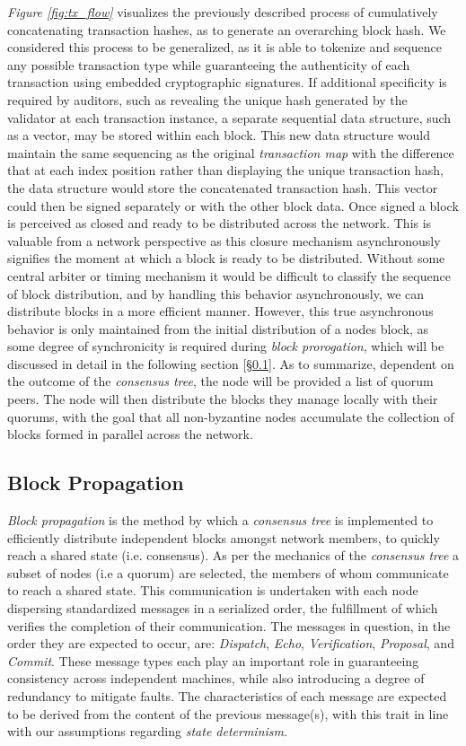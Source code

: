 \textit{Figure \ref{fig:tx_flow}} visualizes the previously described process of cumulatively concatenating transaction hashes, as to generate an overarching block hash. We considered this process to be generalized, as it is able to tokenize and sequence any possible transaction type while guaranteeing the authenticity of each transaction using embedded cryptographic signatures. If additional specificity is required by auditors, such as revealing the unique hash generated by the validator at each transaction instance, a separate sequential data structure, such as a vector, may be stored within each block. This new data structure would maintain the same sequencing as the original \textit{transaction map} with the difference that at each index position rather than displaying the unique transaction hash, the data structure would store the concatenated transaction hash. This vector could then be signed separately or with the other block data. 
Once signed a block is perceived as closed and ready to be distributed across the network. This is valuable from a network perspective as this closure mechanism asynchronously signifies the moment at which a block is ready to be distributed. Without some central arbiter or timing mechanism it would be difficult to classify the sequence of block distribution, and by handling this behavior asynchronously, we can distribute blocks in a more efficient manner. However, this true asynchronous behavior is only maintained from the initial distribution of a nodes block, as some degree of synchronicity is required during \textit{block prorogation}, which will be discussed in detail in the following section [\S\ref{struc:block_prop}]. As to summarize, dependent on the outcome of the \textit{consensus tree}, the node will be provided a list of quorum peers. The node will then distribute the blocks they manage locally with their quorums, with the goal that all non-byzantine nodes accumulate the collection of blocks formed in parallel across the network.

\subsection{Block Propagation}\label{struc:block_prop}
\textit{Block propagation} is the method by which a \textit{consensus tree} is implemented to efficiently distribute independent blocks amongst network members, to quickly reach a shared state (i.e. consensus). As per the mechanics of the \textit{consensus tree} a subset of nodes (i.e a quorum) are selected, the members of whom communicate to reach a shared state. This communication is undertaken with each node dispersing standardized messages in a serialized order, the fulfillment of which verifies the completion of their communication. The messages in question, in the order they are expected to occur, are: \textit{Dispatch}, \textit{Echo}, \textit{Verification}, \textit{Proposal}, and \textit{Commit}. These message types each play an important role in guaranteeing consistency across independent machines, while also introducing a degree of redundancy to mitigate faults. The characteristics of each message are expected to be derived from the content of the previous message(s), with this trait in line with our assumptions regarding \textit{state determinism}.

